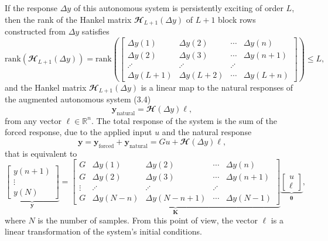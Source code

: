 \documentclass[11pt]{article}
\begin{document}
\begin{itemize}
    If the response $\Delta {y}$  of this autonomous system is persistently exciting of order $L$, then the rank of the Hankel matrix $\mathbfcal{H}_{L+1}(\Delta {y})$ of $L+1$ block rows constructed from $\Delta {y}$ satisfies
    \begin{equation} \tag{3.12} \mathrm{rank} \left( \mathbfcal{H}_{L+1} \left( \Delta {y} \right) \right) = \mathrm{rank} \left( \begin{bmatrix} \Delta y(1) & \Delta y(2) & \cdots & \Delta y(n) \\ \Delta y(2) & \Delta y(3) & \cdots & \Delta y(n+1) \\ \iddots & \iddots & \iddots \\ \Delta y(L+1) & \Delta y(L+2) & \cdots & \Delta y(L+n) \end{bmatrix} \right) \leq L,  \end{equation}
    and the Hankel matrix $\mathbfcal{H}_{L+1}(\Delta {y})$ is a linear map to the natural responses of the augmented autonomous system (3.4) 
    \begin{equation} \tag{3.13} \mathbf{y}_{\mathrm{natural}} = \mathbfcal{H}\left(\Delta {y}\right) \bm{\ell}, \end{equation}
    from any vector $\bm{\ell} \in \mathbb{R}^{n}$.
    The total response of the system is the sum of the forced response, due to the applied input ${u}$ and the natural response
    \begin{equation} \tag{3.14} \mathbf{y} = \mathbf{y}_{\mathrm{forced}}+ \mathbf{y}_{\mathrm{natural}} =G {u} + \mathbfcal{H}\left(\Delta {y}\right) \bm{\ell} ,  \end{equation} 
    that is equivalent to
    \begin{equation} \tag{3.15} \underbrace{ \begin{bmatrix} y(n+1) \\ \vdots \\ y(N) \end{bmatrix}}_{\mathbf{y}} = \underbrace{ \begin{bmatrix} G & \Delta y(1) & \Delta y(2) & \cdots & \Delta y(n) \\ G & \Delta y(2) & \Delta y(3) & \cdots & \Delta y(n+1) \\ \vdots & \iddots & \iddots & \iddots \\ G & \Delta y(N-n) & \Delta y(N-n+1) & \cdots & \Delta y(N-1) \end{bmatrix} }_{\mathbf{K}} \underbrace{ \begin{bmatrix} {{u}} \\ \bm{\ell} \end{bmatrix} }_{\bm{\theta}} , \label{eqn:ddsiemexd} \end{equation}
    where $N$ is the number of samples.
    From this point of view, the vector $\bm{\ell}$ is a linear transformation of the system's initial conditions.  
    \color{black}
    

\end{itemize}
\end{document}
